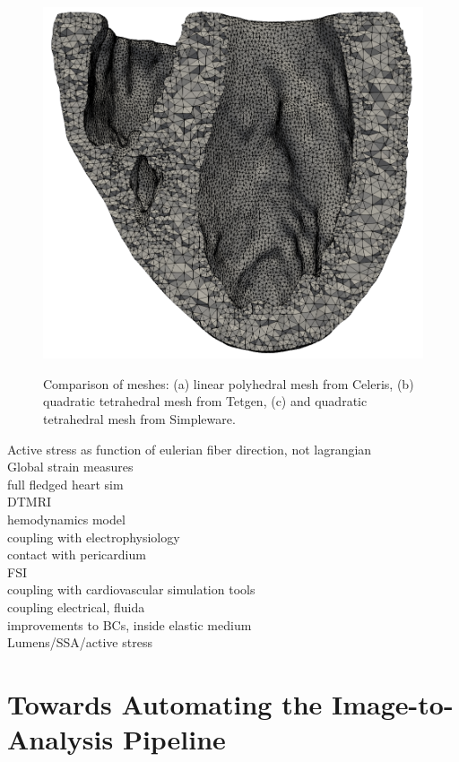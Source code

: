 \begin{figure}[ht!]
{		\includegraphics[scale=0.15]{media/3-celeris/10-simpleware.png}
\label{fig:comp-3}}			
	
%
\caption{Comparison of meshes: (a) linear polyhedral mesh from Celeris, (b) quadratic tetrahedral mesh from Tetgen, (c) and quadratic tetrahedral mesh from Simpleware.}
\label{fig:comp}
\end{figure}


Active stress as function of eulerian fiber direction, not lagrangian \\
Global strain measures \\
full fledged heart sim \\
DTMRI \\
hemodynamics model \\
coupling with electrophysiology \\
contact with pericardium \\
FSI \\
coupling with cardiovascular simulation tools \\
coupling electrical, fluida \\
improvements to BCs, inside elastic medium \\
Lumens/SSA/active stress \\

\section{Towards Automating the Image-to-Analysis Pipeline}
\label{Towards Automating the Image-to-Analysis Pipeline}
